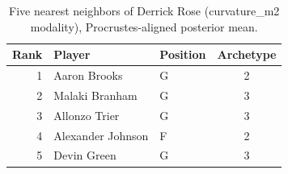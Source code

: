 \begin{table}[htbp]
  \centering\small
  \begin{tabular}{rllc}
    \toprule
    Rank & Player & Position & Archetype \\
    \midrule
    1 & Aaron Brooks & G & 2 \\
    2 & Malaki Branham & G & 3 \\
    3 & Allonzo Trier & G & 3 \\
    4 & Alexander Johnson & F & 2 \\
    5 & Devin Green & G & 3 \\
    \bottomrule
  \end{tabular}
  \caption{Five nearest neighbors of Derrick Rose (curvature_m2 modality), Procrustes-aligned posterior mean.}
  \label{tab:Derrick_Rose_neighbors_curvature_m2}
\end{table}

